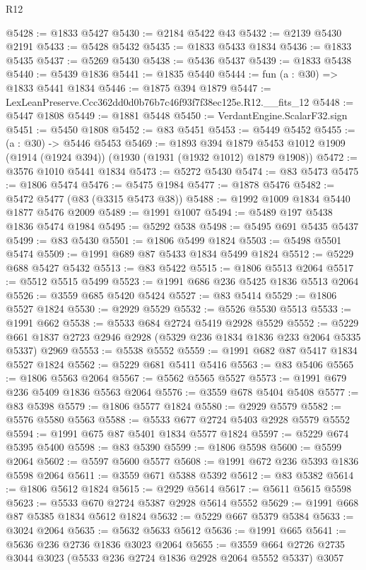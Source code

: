 \begin{lexlean}{R12}
\begin{coremodule}
@5428 := @1833 @5427
@5430 := @2184 @5422 @43
@5432 := @2139 @5430 @2191
@5433 := @5428 @5432
@5435 := @1833 @5433 @1834
@5436 := @1833 @5435
@5437 := @5269 @5430
@5438 := @5436 @5437
@5439 := @1833 @5438
@5440 := @5439 @1836
@5441 := @1835 @5440
@5444 := fun (a : @30) => @1833 @5441 @1834
@5446 := @1875 @394 @1879
@5447 := LexLeanPreserve.Ccc362dd0d0b76b7c46f93f7f38ec125e.R12.__fits_12
@5448 := @5447 @1808
@5449 := @1881 @5448
@5450 := VerdantEngine.ScalarF32.sign
@5451 := @5450 @1808
@5452 := @83 @5451
@5453 := @5449 @5452
@5455 := (a : @30) -> @5446 @5453
@5469 := @1893
    @394
    @1879
    @5453
    @1012
    @1909
    (@1914 (@1924 @394))
    (@1930 (@1931 (@1932 @1012) @1879 @1908))
@5472 := @3576 @1010 @5441 @1834
@5473 := @5272 @5430
@5474 := @83 @5473
@5475 := @1806 @5474
@5476 := @5475 @1984
@5477 := @1878 @5476
@5482 := @5472 @5477 (@83 (@3315 @5473 @38))
@5488 := @1992 @1009 @1834 @5440 @1877 @5476 @2009
@5489 := @1991 @1007
@5494 := @5489 @197 @5438 @1836 @5474 @1984
@5495 := @5292 @538
@5498 := @5495 @691 @5435 @5437
@5499 := @83 @5430
@5501 := @1806 @5499 @1824
@5503 := @5498 @5501 @5474
@5509 := @1991 @689 @87 @5433 @1834 @5499 @1824
@5512 := @5229 @688 @5427 @5432
@5513 := @83 @5422
@5515 := @1806 @5513 @2064
@5517 := @5512 @5515 @5499
@5523 := @1991 @686 @236 @5425 @1836 @5513 @2064
@5526 := @3559 @685 @5420 @5424
@5527 := @83 @5414
@5529 := @1806 @5527 @1824
@5530 := @2929 @5529
@5532 := @5526 @5530 @5513
@5533 := @1991 @662
@5538 := @5533 @684 @2724 @5419 @2928 @5529
@5552 := @5229 @661 @1837 @2723 @2946 @2928 (@5329 @236 @1834 @1836 @233 @2064 @5335 @5337) @2969
@5553 := @5538 @5552
@5559 := @1991 @682 @87 @5417 @1834 @5527 @1824
@5562 := @5229 @681 @5411 @5416
@5563 := @83 @5406
@5565 := @1806 @5563 @2064
@5567 := @5562 @5565 @5527
@5573 := @1991 @679 @236 @5409 @1836 @5563 @2064
@5576 := @3559 @678 @5404 @5408
@5577 := @83 @5398
@5579 := @1806 @5577 @1824
@5580 := @2929 @5579
@5582 := @5576 @5580 @5563
@5588 := @5533 @677 @2724 @5403 @2928 @5579 @5552
@5594 := @1991 @675 @87 @5401 @1834 @5577 @1824
@5597 := @5229 @674 @5395 @5400
@5598 := @83 @5390
@5599 := @1806 @5598
@5600 := @5599 @2064
@5602 := @5597 @5600 @5577
@5608 := @1991 @672 @236 @5393 @1836 @5598 @2064
@5611 := @3559 @671 @5388 @5392
@5612 := @83 @5382
@5614 := @1806 @5612 @1824
@5615 := @2929 @5614
@5617 := @5611 @5615 @5598
@5623 := @5533 @670 @2724 @5387 @2928 @5614 @5552
@5629 := @1991 @668 @87 @5385 @1834 @5612 @1824
@5632 := @5229 @667 @5379 @5384
@5633 := @3024 @2064
@5635 := @5632 @5633 @5612
@5636 := @1991 @665
@5641 := @5636 @236 @2736 @1836 @3023 @2064
@5655 := @3559 @664 @2726 @2735 @3044 @3023 (@5533 @236 @2724 @1836 @2928 @2064 @5552 @5337) @3057

\end{coremodule}
\end{lexlean}
